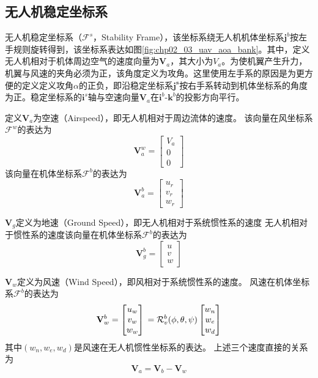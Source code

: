 \subsection{无人机稳定坐标系}
无人机稳定坐标系（$\mathcal{F}^s$，Stability Frame），该坐标系绕无人机机体坐标系$\mathbf{j}^b$按左手规则旋转得到，该坐标系表达如图\ref{fig:chp02_03_uav_aoa_bank}。其中，定义无人机相对于机体周边空气的速度向量为$\mathbf{V}_a$，其大小为$V_a$。为使机翼产生升力，机翼与风速的夹角必须为正，该角度定义为攻角。这里使用左手系的原因是为更方便的定义定义攻角$\alpha$的正负，即沿稳定坐标系$\mathbf{j^s}$按右手系转动到机体坐标系的角度为正。稳定坐标系的$\mathbf{i}^s$轴与空速向量$\mathbf{V}_a$在$\mathbf{i}^b$-$\mathbf{k}^b$的投影方向平行。

定义$\mathbf{V}_a$为空速（Airspeed），即无人机相对于周边流体的速度。
该向量在风坐标系$\mathcal{F}^w$的表达为
\begin{equation} 
	\mathbf{V}_a^w=\begin{bmatrix} V_a \\ 0 \\ 0 \end{bmatrix}
\end{equation}
该向量在机体坐标系$\mathcal{F}^b$的表达为
\begin{equation} 
	\mathbf{V}_a^b = \begin{bmatrix} u_r \\ v_r \\ w_r \end{bmatrix}
\end{equation}

$\mathbf{V}_g$定义为地速（Ground Speed），即无人机相对于系统惯性系的速度
无人机相对于惯性系的速度该向量在机体坐标系$\mathcal{F}^b$的表达为
\begin{equation}
	\mathbf{V}_g^b=\begin{bmatrix} u \\ v \\w \end{bmatrix}
\end{equation}

$\mathbf{V}_w$定义为风速（Wind Speed），即风相对于系统惯性系的速度。
风速在机体坐标系$\mathcal{F}^b$的表达为
\begin{equation}
	\mathbf{V}_w^b=\begin{bmatrix} u_w \\ v_w \\w_w \end{bmatrix} \\
	=\mathcal{R}_v^b(\phi, \theta, \psi) \begin{bmatrix} w_n \\ w_e \\ w_d \end{bmatrix}
\end{equation}
其中$(w_n, w_e, w_d)$是风速在无人机惯性坐标系的表达。
上述三个速度直接的关系为
\begin{equation}
	\mathbf{V}_a = \mathbf{V}_b - \mathbf{V}_w
\end{equation}

